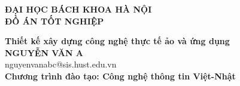 \documentclass[LuanVan.tex]{subfiles}
\begin{document}
\begin{titlepage}
\thispagestyle{empty}
\begin{center}

{\textbf{\large{ĐẠI HỌC BÁCH KHOA HÀ NỘI}}}\\[4cm]

{\textbf{\huge{ ĐỒ ÁN TỐT NGHIỆP}}}\\[1cm]
{\textbf{\Large{Thiết kế xây dựng công nghệ thực tế ảo và ứng dụng}}\\[1cm]

{\textbf{\large{NGUYỄN VĂN A}}}\\
{\large{nguyenvanabc@sis.hust.edu.vn}}\\[0.5cm]

{\textbf{\large{Chương trình đào tạo: Công nghệ thông tin Việt-Nhật
}}}\\

\vspace{4cm}
\begin{table}[H]
\centering
{}
\end{table}}
\end{center}



\end{titlepage}
\end{document}

